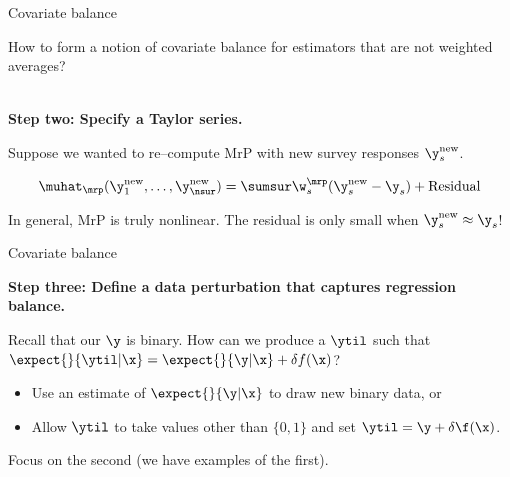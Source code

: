 
\begin{frame}[t]{Covariate balance}


How to form a notion of covariate balance for estimators that are not weighted averages?


\vspace{1em}
\hrulefill\\
\textbf{Step two: Specify a Taylor series.}

\def\new{\mathrm{new}}
Suppose we wanted to re--compute MrP with new
survey responses $\y_s^{\new}$.

$$
\muhat_{\mrp}(\y_1^\new, \ldots, \y_{\nsur}^\new) =
\sumsur \w_s^\mrp (\y_s^\new  - \y_s) + \mathrm{Residual}
$$

In general, MrP is truly nonlinear. The residual is only small when $\y_s^\new \approx \y_s$!


\end{frame}



\begin{frame}[t]{Covariate balance}


\textbf{Step three: Define a data perturbation that captures regression balance.}

Recall that our $\y$ is binary.  How can we produce a $\ytil$ such that
$\expect{}{\ytil \vert \x} = \expect{}{\y \vert \x} + \delta f(\x)$?
%
\begin{itemize}
    \item Use an estimate of $\expect{}{\y \vert \x}$ to draw new binary data, or
    \item Allow $\ytil$ to take values other than $\{0,1\}$ and set
        $\ytil = \y + \delta \f(\x)$.
\end{itemize}
%
Focus on the second (we have examples of the first).

\end{frame}



